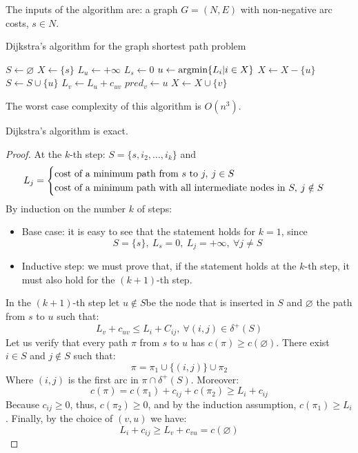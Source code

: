 \documentclass[12pt, a4paper]{report}
\newtheorem[style=M,bodystyle=\normalfont]{proposition}{Proposition}
\newtheorem[style=M,bodystyle=\normalfont]{theorem}{Theorem}
\newtheorem[style=M,bodystyle=\normalfont]{corollary}{Corollary}
\newtheorem[style=M,bodystyle=\normalfont]{lemma}{Lemma}
\newtheorem[style=M,bodystyle=\normalfont]{definition}{Definition}
\begin{document}
    The inputs of the algorithm are: a graph $G = (N, E)$ with non-negative arc costs, $s \in N$. 
    \begin{algorithm}[H]
        \caption{Dijkstra's algorithm for the graph shortest path problem}
            \begin{algorithmic}[1]
                \State $S \leftarrow \varnothing$
                \State $X \leftarrow \{s\}$
                    \State $L_u \leftarrow +\infty$
                \EndFor
                \State $L_s \leftarrow 0$
                    \State $u \leftarrow \textnormal{argmin}\{L_i|i \in X\}$
                    \State $X \leftarrow X-\{u\}$
                    \State $S \leftarrow S \cup \{u\}$
                        \State $L_v \leftarrow L_u+c_{uv}$
                        \State $pred_v \leftarrow u$
                        \State $X \leftarrow X \cup \{v\}$
                    \EndFor
                \EndWhile
            \end{algorithmic}
    \end{algorithm}
    The worst case complexity of this algorithm is $O(n^3)$. 
    \begin{example}[Proposition]
        Dijkstra's algorithm is exact. 
    \end{example}
    \begin{proof}
        At the $k$-th step: $S = \{s,i_2,\dots,i_k\}$ and 
        \[L_j=
        \begin{cases}
            \textnormal{cost of a minimum path from } s \textnormal{ to } j,\:j \in S \\ 
            \textnormal{cost of a minimum path with all intermediate nodes in } S, \: j \notin S
        \end{cases}
        \]
        By induction on the number $k$ of steps: 
        \begin{itemize}
            \item Base case: it is easy to see that the statement holds for $k = 1$, since 
                \[S=\{s\},\: L_s=0,\: L_j= +\infty,\: \forall j \neq S \]
            \item Inductive step: we must prove that, if the statement holds at the $k$-th step, it must also hold for the $(k + 1)$-th step. 
        \end{itemize}
        In the $(k + 1)$-th step let $u \notin S$be the node that is inserted in $S$ and $\varnothing$ the path from $s$ to $u$ such that:
        \[L_v + c_{uv} \leq L_i + C_{ij},\: \forall(i,j) \in \delta^{+}(S)\]
        Let us verify that every path $\pi$ from $s$ to $u$ has $c(\pi) \geq c(\varnothing)$. There exist $i \in S$ and $j \notin S$ such that: 
        \[\pi= \pi_1 \cup \{(i,j)\} \cup \pi_2\]
        Where $(i, j)$ is the first arc in $\pi \cap \delta^{+}(S)$. Moreover: 
        \[c(\pi) = c(\pi_1) + c_{ij} + c(\pi_2) \geq L_i + c_{ij}\]
        Because $c_{ij} \geq 0$, thus, $c(\pi_2) \geq 0$, and by the induction assumption, $c(\pi_1) \geq L_i$. Finally, by the choice of $(v,u)$ we have: 
        \[L_i + c_{ij} \geq L_v + c_{vu} = c(\varnothing)\]
    \end{proof}
\end{document}
